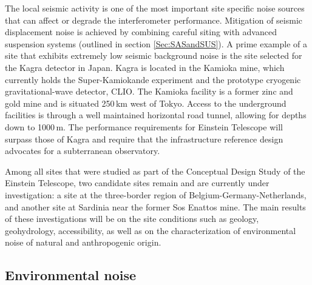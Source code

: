 The local seismic activity is one of the most important site specific noise sources that can affect or degrade the interferometer performance. Mitigation of seismic displacement noise is achieved by combining careful siting with advanced suspension systems (outlined in section \ref{Sec:SASandSUS}). A prime example of a site that exhibits extremely low seismic background noise is the site selected for the Kagra detector in Japan. Kagra is located in the Kamioka mine, which currently holds the Super-Kamiokande experiment and the prototype cryogenic gravitational-wave detector, CLIO. The Kamioka facility is a former zinc and gold mine and is situated 250\,km west of Tokyo. Access to the underground facilities is through a well maintained horizontal road tunnel, allowing for depths down to 1000\,m. The performance requirements for Einstein Telescope will surpass those of Kagra and require that the infrastructure reference design advocates for a subterranean observatory. 

Among all sites that were studied as part of the Conceptual Design Study of the Einstein Telescope, two candidate sites remain and are currently under investigation: a site at the three-border region of Belgium-Germany-Netherlands, and another site at Sardinia near the former Sos Enattos mine. The main results of these investigations will be on the site conditions such as geology, geohydrology, accessibility, as well as on the characterization of environmental noise of natural and anthropogenic origin.

\subsection{Environmental noise}
\label{sec:envnoise}

\FloatBarrier
